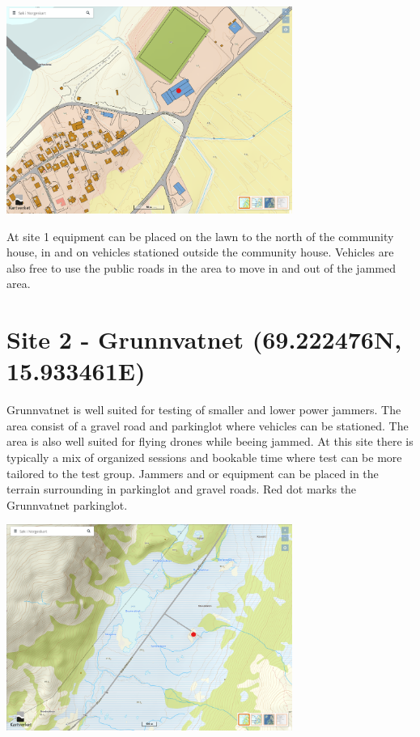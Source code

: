 \begin{center}
\includegraphics[width = 0.7\textwidth]{bleik}\\
\end{center}
At site 1 equipment can be placed on the lawn to the north of the community house, in and on vehicles stationed outside the community house. Vehicles are also free to use the public roads in the area to move in and out of the jammed area.



\section{Site 2 - Grunnvatnet (69.222476N, 15.933461E)}
Grunnvatnet is well suited for testing of smaller and lower power jammers. The area consist of a gravel road and parkinglot where vehicles can be stationed. The area is also well suited for flying drones while beeing jammed. At this site there is typically a mix of organized sessions and bookable time where test can be more tailored to the test group. Jammers and or equipment can be placed in the terrain surrounding in parkinglot and gravel roads. Red dot marks the Grunnvatnet parkinglot.\\

\begin{center}
\includegraphics[width = 0.7\textwidth]{grunnvatnet.png}\\
\end{center}

